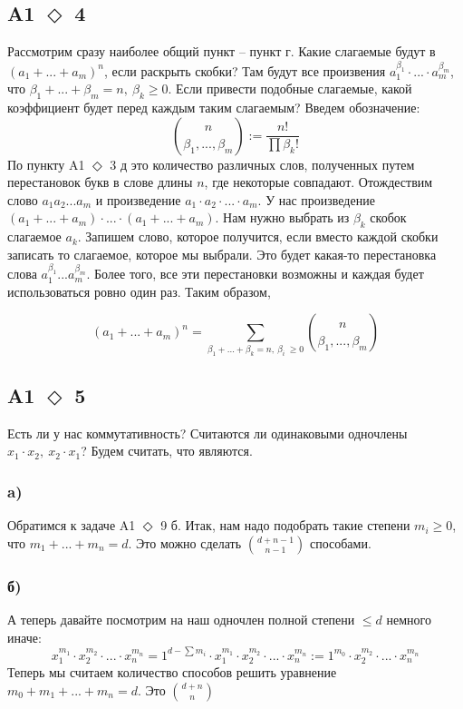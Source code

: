 \documentclass[a4paper]{article}
\begin{document}
  \subsection*{A1 $\Diamond$ 4}
  Рассмотрим сразу наиболее общий пункт -- пункт г. Какие слагаемые будут в $(a_1 + ... + a_m)^n$, если раскрыть скобки? Там будут все произвения $a_1^{\beta_1}\cdot ... \cdot a_m^{\beta_m}$, что $\beta_1 + ... + \beta_m = n, \: \beta_k \ge 0$. Если привести подобные слагаемые, какой коэффициент будет перед каждым таким слагаемым?
  Введем обозначение:
  $$\binom{n}{\beta_1, ..., \beta_m } := \frac{n!}{\prod \beta_k!}$$
  По пункту A1 $\Diamond$ 3 д это количество различных слов, полученных путем перестановок букв в слове длины $n$, где некоторые совпадают. Отождествим слово $a_1a_2...a_m$ и произведение $a_1\cdot a_2\cdot ... \cdot a_m$. У нас произведение $(a_1 + ... + a_m) \cdot ... \cdot (a_1 + ... + a_m)$. Нам нужно выбрать из $\beta_k$ скобок слагаемое $a_k$. Запишем слово, которое получится, если вместо каждой скобки записать то слагаемое, которое мы выбрали. Это будет какая-то перестановка слова $a_1^{\beta_1} ... a_m^{\beta_m}$. Более того, все эти перестановки возможны и каждая будет использоваться ровно один раз.
  Таким образом,

  $$(a_1 + ... + a_m)^n = \sum_{\beta_1 + ... + \beta_k = n, \: \beta_i\ \ge 0} \binom{n}{\beta_1, ..., \beta_m }$$

  \subsection*{A1 $\Diamond$ 5}
  Есть ли у нас коммутативность? Считаются ли одинаковыми одночлены $x_1 \cdot x_2, \: x_2 \cdot x_1$? Будем считать, что являются.

  \subsubsection*{a)}
  Обратимся к задаче A1 $\Diamond$ 9 б.
  Итак, нам надо подобрать такие степени $m_i \ge 0$, что $m_1 + ... + m_n = d$. Это можно сделать $\binom{d + n - 1}{n - 1}$ способами.
  \subsubsection*{б)}
  А теперь давайте посмотрим на наш одночлен полной степени $\le d$ немного иначе:
  $$x_1^{m_1} \cdot x_2^{m_2} \cdot ... \cdot x_n^{m_n} = 1^{d - \sum m_i} \cdot x_1^{m_1} \cdot x_2^{m_2} \cdot ... \cdot x_n^{m_n} :=1^{m_0} \cdot x_2^{m_2} \cdot ... \cdot x_n^{m_n}$$
  Теперь мы считаем количество способов решить уравнение $m_0 + m_1 + ... + m_n = d$. Это $\binom{d + n}{n}$
\end{document}
